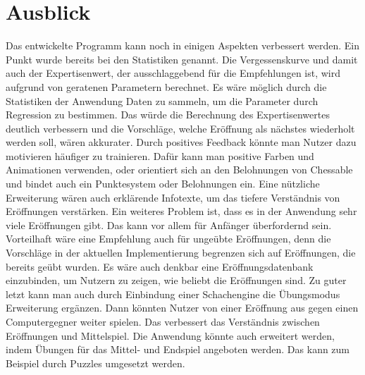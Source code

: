 \section{Ausblick}
Das entwickelte Programm kann noch in einigen Aspekten verbessert werden. Ein Punkt wurde bereits bei den Statistiken genannt. Die Vergessenskurve und damit auch der Expertisenwert, der ausschlaggebend für die Empfehlungen ist, wird aufgrund von geratenen Parametern berechnet. Es wäre möglich durch die Statistiken der Anwendung Daten zu sammeln, um die Parameter durch Regression zu bestimmen. Das würde die Berechnung des Expertisenwertes deutlich verbessern und die Vorschläge, welche Eröffnung als nächstes wiederholt werden soll, wären akkurater.
Durch positives Feedback könnte man Nutzer dazu motivieren häufiger zu trainieren. Dafür kann man positive Farben und Animationen verwenden, oder orientiert sich an den Belohnungen von Chessable und bindet auch ein Punktesystem oder Belohnungen ein.
Eine nützliche Erweiterung wären auch erklärende Infotexte, um das tiefere Verständnis von Eröffnungen verstärken.
Ein weiteres Problem ist, dass es in der Anwendung sehr viele Eröffnungen gibt. Das kann vor allem für Anfänger überfordernd sein. Vorteilhaft wäre eine Empfehlung auch für ungeübte Eröffnungen, denn die Vorschläge in der aktuellen Implementierung begrenzen sich auf Eröffnungen, die bereits geübt wurden. Es wäre auch denkbar eine Eröffnungsdatenbank einzubinden, um Nutzern zu zeigen, wie beliebt die Eröffnungen sind.
Zu guter letzt kann man auch durch Einbindung einer Schachengine die Übungsmodus Erweiterung ergänzen. Dann könnten Nutzer von einer Eröffnung aus gegen einen Computergegner weiter spielen. Das verbessert das Verständnis zwischen Eröffnungen und Mittelspiel.
Die Anwendung könnte auch erweitert werden, indem Übungen für das Mittel- und Endspiel angeboten werden. Das kann zum Beispiel durch Puzzles umgesetzt werden.
